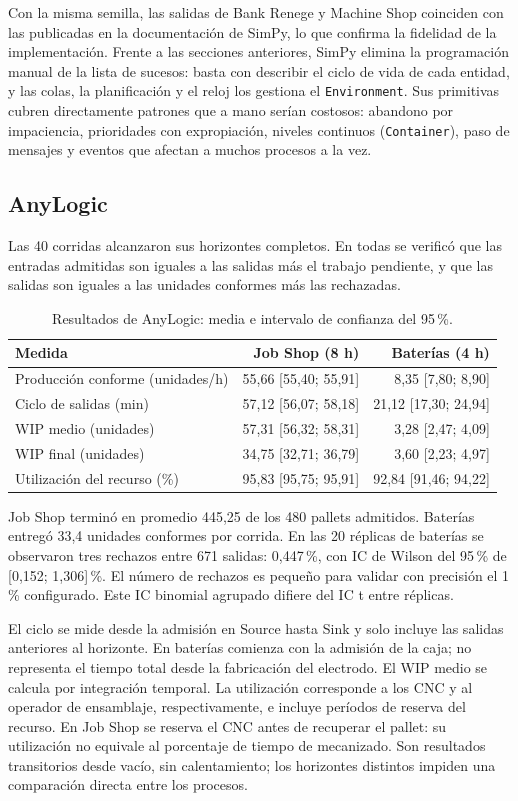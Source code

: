 \documentclass[11pt,a4paper]{article}
\begin{document}
Con la misma semilla, las salidas de Bank Renege y Machine Shop coinciden con las
publicadas en la documentación de SimPy, lo que confirma la fidelidad de la
implementación. Frente a las secciones anteriores, SimPy elimina la programación manual de
la lista de sucesos: basta con describir el ciclo de vida de cada entidad, y las colas, la
planificación y el reloj los gestiona el \texttt{Environment}. Sus primitivas cubren
directamente patrones que a mano serían costosos: abandono por impaciencia, prioridades con
expropiación, niveles continuos (\texttt{Container}), paso de mensajes y eventos que afectan
a muchos procesos a la vez.

\subsection{AnyLogic}
Las 40 corridas alcanzaron sus horizontes completos. En todas se verificó que las
entradas admitidas son iguales a las salidas más el trabajo pendiente, y que las
salidas son iguales a las unidades conformes más las rechazadas.

\begin{table}[H]\centering\small
\caption{Resultados de AnyLogic: media e intervalo de confianza del 95\,\%.}
\begin{tabular}{lrr}\toprule
Medida & Job Shop (8 h) & Baterías (4 h)\\\midrule
Producción conforme (unidades/h) & 55,66 [55,40; 55,91] & 8,35 [7,80; 8,90]\\
Ciclo de salidas (min) & 57,12 [56,07; 58,18] & 21,12 [17,30; 24,94]\\
WIP medio (unidades) & 57,31 [56,32; 58,31] & 3,28 [2,47; 4,09]\\
WIP final (unidades) & 34,75 [32,71; 36,79] & 3,60 [2,23; 4,97]\\
Utilización del recurso (\%) & 95,83 [95,75; 95,91] & 92,84 [91,46; 94,22]\\\bottomrule
\end{tabular}\end{table}

Job Shop terminó en promedio 445,25 de los 480 pallets admitidos. Baterías entregó
33,4 unidades conformes por corrida. En las 20 réplicas de baterías se observaron
tres rechazos entre 671 salidas: 0,447\,\%, con IC de Wilson del 95\,\% de
[0,152; 1,306]\,\%. El número de rechazos es pequeño para validar con precisión
el 1\,\% configurado. Este IC binomial agrupado difiere del IC t entre réplicas.

El ciclo se mide desde la admisión en Source hasta Sink y solo incluye las salidas
anteriores al horizonte. En baterías comienza con la admisión de la caja; no representa
el tiempo total desde la fabricación del electrodo. El WIP medio se calcula por
integración temporal. La utilización corresponde a los CNC y al operador de ensamblaje,
respectivamente, e incluye períodos de reserva del recurso. En Job Shop se reserva el
CNC antes de recuperar el pallet: su utilización no equivale al porcentaje de tiempo
de mecanizado. Son resultados transitorios desde vacío, sin calentamiento; los
horizontes distintos impiden una comparación directa entre los procesos.
\end{document}
